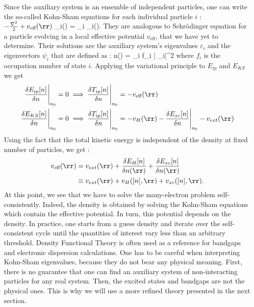 Since the auxiliary system is an ensemble of independent particles, one can write the so-called Kohn-Sham equations for each individual particle $i$ :
\be
 	\( -\frac{\nabla^2}{2} + v_{\text{eff}}(\rr)\) \psi_i(\rr) = \varepsilon_i \psi_i(\rr).
\ee
They are analogous to Schrödinger equation for a particle evolving in a local effective potential $v_{\text{eff}}$, that we have yet to determine. Their solutions are the auxiliary system's eigenvalues $\varepsilon_i$ and the eigenvectors $\psi_i$ that are defined as :
\be
 	n(\rr) = \sum_i f_i \left| \psi_i\right|^2
\ee
where $f_i$ is the occupation number of state $i$. 
Applying the variational principle to $E_{ip}$ and $E_{KS}$ we get 
\begin{align}
    \frac{\delta E_{ip}[n]}{\delta n} \Biggr|_{n_0} = 0 &\implies \frac{\delta T_{ip}[n]}{\delta n} \Biggr|_{n_0} = - v_{\text{eff}}(\rr) \\
    \frac{\delta E_{KS}[n]}{\delta n} \Biggr|_{n_0} = 0 &\implies \frac{\delta T_{ip}[n]}{\delta n} \Biggr|_{n_0} = - v_H(\rr) - \frac{\delta E_{xc}[n]}{\delta n} \Biggr|_{n_0} - v_{ext}(\rr)
\end{align}
Using the fact that the total kinetic energy is independent of the density at fixed number of particles, we get :
\begin{align}
\begin{split}
	v_{\text{eff}}(\rr) &= v_{ext}(\rr) + \frac{\delta E_H[n]}{\delta n(\rr)} + \frac{\delta E_{xc}[n]}{\delta n(\rr)} \\
	&\equiv v_{ext}(\rr) + v_H([n],\rr) + v_{xc}([n],\rr).
\end{split}
\end{align}
At this point, we see that we have to solve the many-electron problem self-consistently. Indeed, the density is obtained by solving the Kohn-Sham equations which contain the effective potential. In turn, this potential depends on the density. In practice, one starts from a guess density and iterate over the self-consistent cycle until the quantities of interest vary less than an arbitrary threshold.
Density Functional Theory is often used as a reference for bandgaps and electronic dispersion calculations. One has to be careful when interpreting Kohn-Sham eigenvalues, because they do not bear any physical meaning. First, there is no guarantee that one can find an auxiliary system of non-interacting particles for any real system. Then, the excited states and bandgaps are not the physical ones. This is why we will use a more refined theory presented in the next section.

